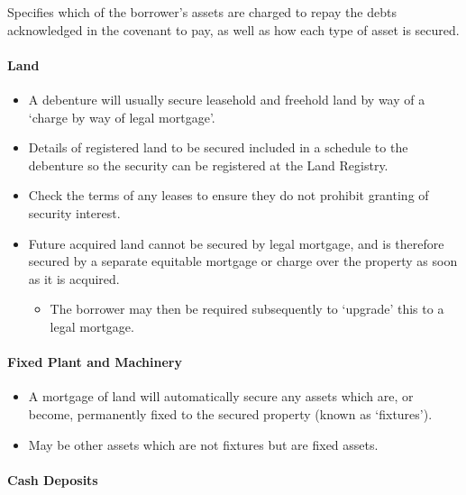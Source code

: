 \documentclass[
]{article}
\providecommand{\tightlist}{%
  \setlength{\itemsep}{0pt}\setlength{\parskip}{0pt}}
\begin{document}
Specifies which of the borrower's assets are charged to repay the debts
acknowledged in the covenant to pay, as well as how each type of asset
is secured.

\hypertarget{land}{%
\paragraph{Land}\label{land}}

\begin{itemize}
\tightlist
\item
  A debenture will usually secure leasehold and freehold land by way of
  a `charge by way of legal mortgage'.
\item
  Details of registered land to be secured included in a schedule to the
  debenture so the security can be registered at the Land Registry.
\item
  Check the terms of any leases to ensure they do not prohibit granting
  of security interest.
\item
  Future acquired land cannot be secured by legal mortgage, and is
  therefore secured by a separate equitable mortgage or charge over the
  property as soon as it is acquired.

  \begin{itemize}
  \tightlist
  \item
    The borrower may then be required subsequently to `upgrade' this to
    a legal mortgage.
  \end{itemize}
\end{itemize}

\hypertarget{fixed-plant-and-machinery}{%
\paragraph{Fixed Plant and Machinery}\label{fixed-plant-and-machinery}}

\begin{itemize}
\tightlist
\item
  A mortgage of land will automatically secure any assets which are, or
  become, permanently fixed to the secured property (known as
  `fixtures').
\item
  May be other assets which are not fixtures but are fixed assets.
\end{itemize}

\hypertarget{cash-deposits}{%
\paragraph{Cash Deposits}\label{cash-deposits}}
\end{document}
